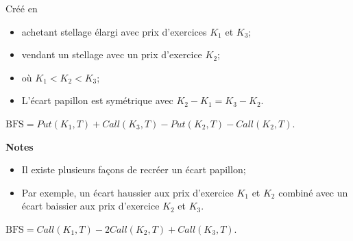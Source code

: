 \documentclass[10pt, french]{article}
\begin{document}
\begin{multicols*}{2}
\begin{definitionNOHFILL}
\begin{center}
\end{center}
\end{definitionNOHFILL}

\begin{definitionNOHFILL}
Créé en 
\begin{itemize}[leftmargin = *]
	\item	achetant stellage élargi avec prix d'exercices $K_{1}$ et $K_{3}$;
	\item	vendant un stellage avec un prix d'exercice $K_{2}$; 
	\item	où $K_{1} < K_{2} < K_{3}$;
	\item	L'écart papillon	 est symétrique avec $K_{2} - K_{1} = K_{3} - K_{2}$.
\end{itemize}

$\text{BFS} = Put(K_1, T) + Call(K_3, T) - Put(K_2, T) - Call(K_2, T)$.

\textbf{Notes}
\begin{itemize}[leftmargin = *]
	\item	Il existe plusieurs façons de recréer un écart papillon;
	\item	Par exemple, un écart haussier aux prix d'exercice $K_{1}$ et $K_{2}$ combiné avec un écart baissier aux prix d'exercice $K_{2}$ et $K_{3}$.
\end{itemize}
$\text{BFS} = Call(K_1, T) - 2 Call(K_2, T) + Call(K_3, T)$.

\begin{center}
	
\end{center}
\end{definitionNOHFILL}


\end{multicols*}
\end{document}
